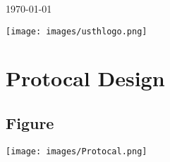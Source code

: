 \documentclass[12pt]{article}
\begin{document}
\begin{titlepage}
		
		
		
		
		{\large \today}\\[1cm] %
		
		\begin{center}
			\texttt{[image: images/usthlogo.png]}\\[1cm]
		\end{center}
		
		
		\vfill %
		
	\end{titlepage}
	
	\tableofcontents
	\newpage
	
	\section{Protocal Design}
	\subsection{Figure}
	\begin{center}
		\texttt{[image: images/Protocal.png]}\\[1cm]
	\end{center}
\end{document}
